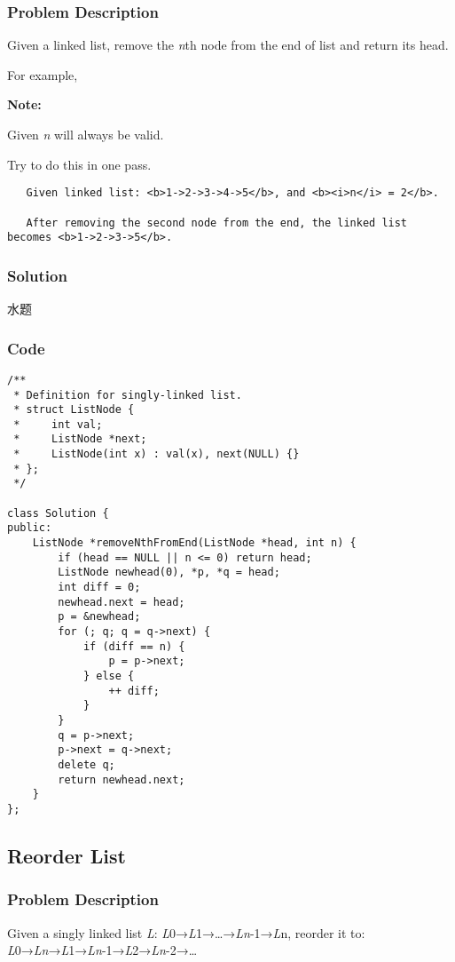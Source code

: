 \documentclass[courier]{article}
\begin{document}
\begin{CJK*}{UTF8}{gkai}
\subsubsection*{Problem Description}
Given a linked list, remove the \emph{n}th node from the end of list and return its head.

For example,

\textbf{Note:}


Given \emph{n} will always be valid.


Try to do this in one pass.

\begin{verbatim}
   Given linked list: <b>1->2->3->4->5</b>, and <b><i>n</i> = 2</b>.

   After removing the second node from the end, the linked list becomes <b>1->2->3->5</b>.
\end{verbatim}


\subsubsection*{Solution}
水题

\subsubsection*{Code}
\begin{lstlisting}
/**
 * Definition for singly-linked list.
 * struct ListNode {
 *     int val;
 *     ListNode *next;
 *     ListNode(int x) : val(x), next(NULL) {}
 * };
 */

class Solution {
public:
    ListNode *removeNthFromEnd(ListNode *head, int n) {
        if (head == NULL || n <= 0) return head;
        ListNode newhead(0), *p, *q = head;
        int diff = 0;
        newhead.next = head;
        p = &newhead;
        for (; q; q = q->next) {
            if (diff == n) {
                p = p->next;
            } else {
                ++ diff;
            }
        }
        q = p->next;
        p->next = q->next;
        delete q;
        return newhead.next;
    }
}; 
\end{lstlisting}


\subsection{ Reorder List }

\subsubsection*{Problem Description}
Given a singly linked list \emph{L}: \emph{L}0→\emph{L}1→…→\emph{L}\emph{n}-1→\emph{L}n,
reorder it to: \emph{L}0→\emph{L}\emph{n}→\emph{L}1→\emph{L}\emph{n}-1→\emph{L}2→\emph{L}\emph{n}-2→…


\end{CJK*}
\end{document}
